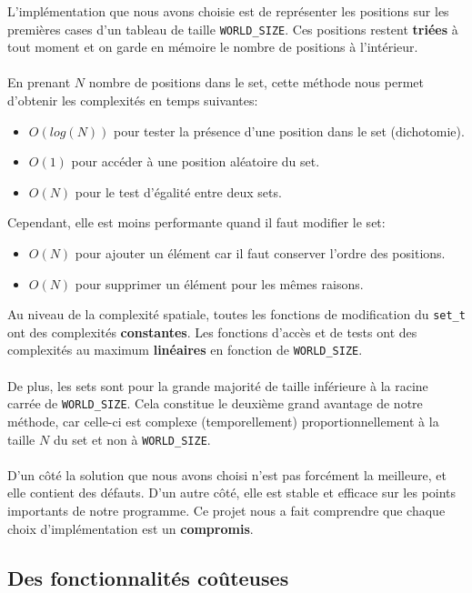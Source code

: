 \documentclass{article}
\begin{document}
L'implémentation que nous avons choisie est de représenter les positions sur les premières cases d'un tableau de taille \lstinline{WORLD_SIZE}. 
Ces positions restent \textbf{triées} à tout moment et on garde en mémoire le nombre de positions à l'intérieur.
\\\\
En prenant $N$ nombre de positions dans le set,
cette méthode nous permet d'obtenir les complexités en temps suivantes:
\begin{itemize}
    \item $O(log(N))$ pour tester la présence d'une position dans le set (dichotomie).
    \item $O(1)$ pour accéder à une position aléatoire du set.
    \item $O(N)$ pour le test d'égalité entre deux sets.
    \\
\end{itemize}
Cependant, elle est moins performante quand il faut modifier le set:
\begin{itemize}
    \item $O(N)$ pour ajouter un élément car il faut conserver l'ordre des positions.
    \item $O(N)$ pour supprimer un élément pour les mêmes raisons.
    \\
\end{itemize}

Au niveau de la complexité spatiale, toutes les fonctions de modification du \lstinline{set_t} ont des complexités \textbf{constantes}. 
Les fonctions d'accès et de tests ont des complexités au maximum \textbf{linéaires} en fonction de \lstinline{WORLD_SIZE}.
\\\\
De plus, les sets sont pour la grande majorité de taille inférieure à la racine carrée de \lstinline{WORLD_SIZE}.
Cela constitue le deuxième grand avantage de notre méthode, car celle-ci est complexe (temporellement) proportionnellement à la taille $N$ du set et non à \lstinline{WORLD_SIZE}.
\\\\
D'un côté la solution que nous avons choisi n'est pas forcément la meilleure, et elle contient des défauts. 
D'un autre côté, elle est stable et efficace sur les points importants de notre programme.
Ce projet nous a fait comprendre que chaque choix d'implémentation est un \textbf{compromis}.

\subsection{Des fonctionnalités coûteuses}
\end{document}
